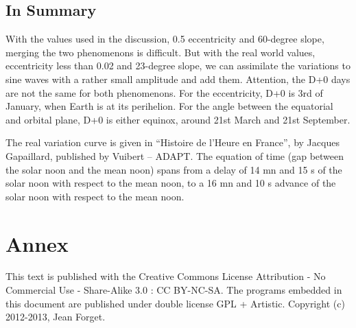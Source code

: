 \documentclass[a4paper]{article}
\newenvironment{texte}{\rmfamily}{}
\begin{document}
\begin{texte}
\subsection{In Summary}

With the values used in the discussion, 0.5 eccentricity and 
60-degree slope, merging the two phenomenons is difficult.
But with the real world values, eccentricity less than 0.02
and 23-degree slope, we can assimilate the variations to
sine waves with a rather small amplitude
and add them. Attention, the D+0 days are not the same for
both phenomenons. For the eccentricity, D+0 is 3rd of January,
when Earth is at its perihelion. For the angle between the equatorial
and orbital plane, D+0 is either equinox, around 21st
March and 21st September.

The real variation curve is given in
``Histoire de l'Heure en France'', 
by Jacques Gapaillard, published by Vuibert -- ADAPT. 
The equation of time (gap between the solar noon and the
mean noon) spans from a delay of 14 mn and 15 s of the 
solar noon with respect to the mean noon, to a 16 mn and
10 s advance of the solar noon with respect to the mean noon.

\section{Annex}

This text is published with the Creative Commons License
Attribution - No Commercial Use - Share-Alike 
3.0 : CC BY-NC-SA.
The programs embedded in this document are published
under double license GPL + Artistic.
Copyright (c) 2012-2013, Jean Forget.

\end{texte}
\end{document}
